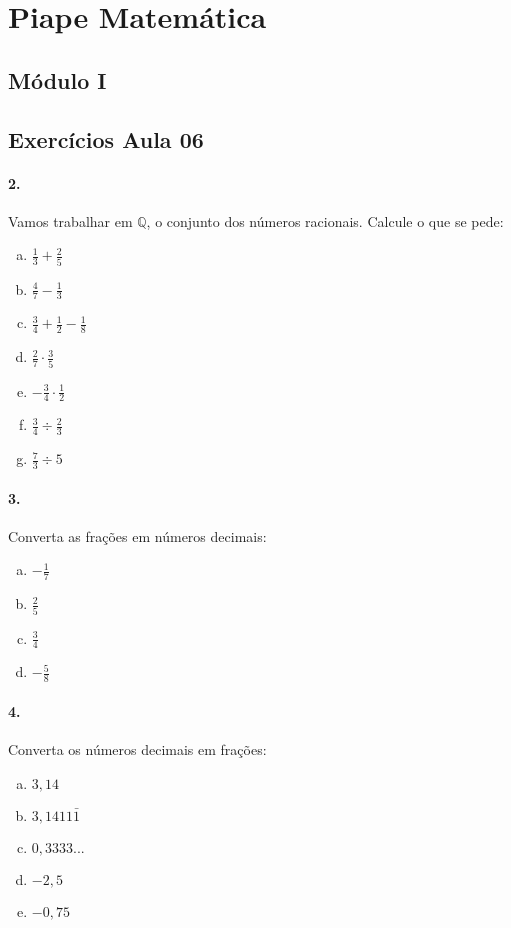 \documentclass[a4paper,twocolumn,12pt]{article}
\begin{document}
 
\section*{Piape Matemática} 

\subsection*{Módulo I}
\subsection*{Exercícios Aula 06}

\paragraph*{2. } Vamos trabalhar em $\mathbb{Q}$, o conjunto dos números racionais. Calcule o que se pede:

\begin{enumerate}[a)]
\item $\displaystyle\frac{1}{3} + \frac{2}{5}$
\item $\displaystyle\frac{4}{7} - \frac{1}{3}$
\item $\displaystyle\frac{3}{4} + \frac{1}{2} - \frac{1}{8}$
\item $\displaystyle\frac{2}{7}\cdot \frac{3}{5}$
\item $\displaystyle-\frac{3}{4} \cdot \frac{1}{2}$
\item $\displaystyle\frac{3}{4} \div \frac{2}{3}$
\item $\displaystyle \frac{7}{3} \div 5$
\end{enumerate}


\paragraph*{3. } Converta as frações em números decimais:
\begin{enumerate}[a)]
\item $\displaystyle-\frac{1}{7}$
\item $\displaystyle\frac{2}{5}$
\item $\displaystyle\frac{3}{4}$
\item $\displaystyle-\frac{5}{8}$
\end{enumerate}

\paragraph*{4. } Converta os números decimais em frações:
\begin{enumerate}[a)]
\item $3,14$
\item $3,1411\bar{1}$
\item $0,3333...$
\item $-2,5$
\item $-0,75$
\end{enumerate}
\end{document}
